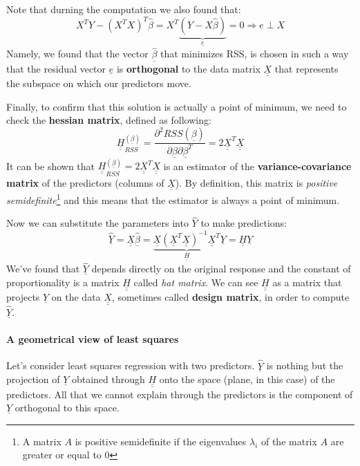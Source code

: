 Note that durning the computation we also found that:
\[
    X^T Y - (X^T X)^T \hat \beta = X^T\underbrace{(Y-X\hat{\beta})}_{\underline {e}} = 0 \Rightarrow e \perp X
\]
Namely, we found that the vector $\hat{\underline \beta}$ that minimizes RSS, is chosen in such a way that the residual vector $\underline e$ is \textbf{orthogonal} to the data matrix $\underline {\underline X}$ that represents the subspace on which our predictors move.

Finally, to confirm that this solution is actually a point of minimum, we need to check the \textbf{hessian matrix}, defined as following:
\[
    \underline {\underline H}_{RSS}^{(\underline\beta)} = \frac{\partial^2 RSS(\underline\beta)}{\partial \underline\beta \partial \underline\beta^T} = 2 \underline {\underline X}^T \underline {\underline X}
\]
It can be shown that $\underline {\underline H}_{RSS}^{(\underline\beta)} = 2 \underline {\underline X}^T \underline {\underline X}$ is an estimator of the \textbf{variance-covariance matrix} of the predictors (columns of $\underline {\underline X}$). By definition, this matrix is \textit{positive semidefinite}\footnote{A matrix $A$ is positive semidefinite if the eigenvalues $\lambda_i$ of the matrix $A$ are greater or equal to 0} and this means that the estimator is always a point of minimum.

Now we can substitute the parameters into $\hat{Y}$ to make predictions:
\[
    \underline{\hat{Y}} = \underline{\underline{X}} \underline{\hat{\beta}} =   \underbrace{\underline{\underline{X}} (\underline {\underline X}^T \underline {\underline X})^{-1} \underline {\underline X}^T}_{\underline {\underline H}} \underline Y = \underline {\underline H}\underline Y
\]
We've found that $\hat{\underline Y}$ depends directly on the original response and the constant of proportionality is a matrix $\underline {\underline H}$ called \textit{hat matrix}.
We can see $\underline {\underline H}$ as a matrix that projects $\underline Y$ on the data $\underline {\underline X}$, sometimes called \textbf{design matrix}, in order to compute $\hat{\underline Y}$.

\paragraph*{A geometrical view of least squares}
Let's consider least squares regression with two predictors. $\hat{\underline Y}$ is nothing but the projection of $\underline Y$ obtained through $\underline {\underline H}$ onto the space (plane, in this case) of the predictors. All that we cannot explain through the predictors is the component of $\underline Y$ orthogonal to this space.

